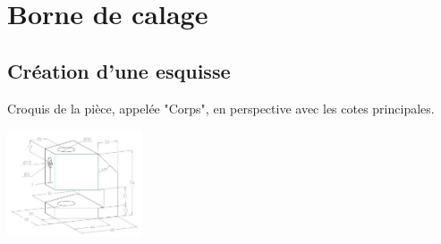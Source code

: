 

\section{Borne de calage}

\subsection{Création d'une esquisse}

\begin{minipage}{0.6\linewidth}
Croquis de la pièce, appelée "Corps", en perspective avec les cotes principales.
\end{minipage}
\hfill
\begin{minipage}{0.35\linewidth}
\begin{center}
 \includegraphics[width=4cm]{img/001_4}
\end{center}
\end{minipage}

